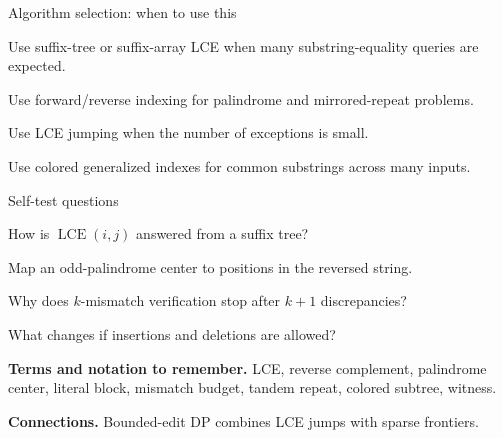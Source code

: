 \documentclass[11pt,letterpaper]{article}
\begin{document}
\begin{CornellOverviewBox}{Algorithm selection: when to use this}
\begin{CornellChecklist}
  \item Use suffix-tree or suffix-array LCE when many substring-equality queries are expected.
  \item Use forward/reverse indexing for palindrome and mirrored-repeat problems.
  \item Use LCE jumping when the number of exceptions is small.
  \item Use colored generalized indexes for common substrings across many inputs.
\end{CornellChecklist}
\end{CornellOverviewBox}

\begin{CornellExamBox}{Self-test questions}
\begin{CornellRecallList}
  \item How is $\operatorname{LCE}(i,j)$ answered from a suffix tree?
  \item Map an odd-palindrome center to positions in the reversed string.
  \item Why does $k$-mismatch verification stop after $k+1$ discrepancies?
  \item What changes if insertions and deletions are allowed?
\end{CornellRecallList}
\end{CornellExamBox}

{\footnotesize
\textbf{Terms and notation to remember.} LCE, reverse complement, palindrome center, literal block, mismatch budget, tandem repeat, colored subtree, witness.

\textbf{Connections.} Bounded-edit DP combines LCE jumps with sparse frontiers.
}
\end{document}
